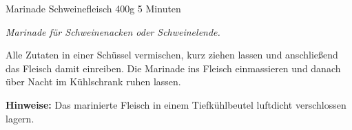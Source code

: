\begin{recipe}{Marinade Schweinefleisch} {400g} {5 Minuten}

  \freeform
  \textit{Marinade für Schweinenacken oder Schweinelende.}


  Alle Zutaten in einer Schüssel vermischen, kurz ziehen lassen und anschließend das Fleisch damit einreiben.
  Die Marinade ins Fleisch einmassieren und danach über Nacht im Kühlschrank ruhen lassen.

  \freeform
  \hrulefill

  \freeform
  \textbf{Hinweise:}
  Das marinierte Fleisch in einem Tiefkühlbeutel luftdicht verschlossen lagern.

\end{recipe}
